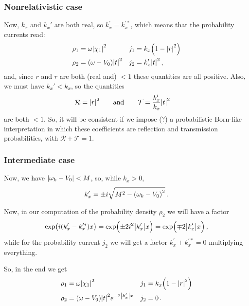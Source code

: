\documentclass[main.tex]{subfiles}
\begin{document}
\subsubsection{Nonrelativistic case}

Now, \(k_x\) and \(k_x'\) are both real, so \(k_x^{\prime } = k_x^{\prime *}\), which means that the probability currents read: 
%
\begin{align}
\rho_1 &= \omega \abs{\chi_1 }^2
&
j_1 &= k_x \qty(1 - \abs{r}^2) \\
\rho_2 &= (\omega - V_0 ) \abs{t}^2 
&
j_2 &=  k_x^{\prime } \abs{t}^2 
\,,
\end{align}
%
and, since \(r\) and \(r\) are both (real and) \(<1\) these quantities are all positive. Also, we must have \(k_x' < k_x\), so the quantities 
%
\begin{align}
\mathcal{R} &= \abs{r}^2
\qquad \text{and} \qquad
\mathcal{T} = \frac{k_x'}{k_x} \abs{t}^2
\,
\end{align}
%
are both \(<1\). So, it will be consistent if we impose (?) a probabilistic Born-like interpretation in which these coefficients are reflection and transmission probabilities, with \(\mathcal{R} + \mathcal{T} = 1\).

\subsubsection{Intermediate case}

Now, we have \(\abs{\omega_{k} - V_0 } < M\), so, while \(k_x>0\), 
%
\begin{align}
k_x' = \pm i \sqrt{M^2 - \qty(\omega_{k} - V_0 )^2}
\,.
\end{align}


Now, in our computation of the probability density \(\rho_2 \) we will have a factor 
%
\begin{align}
\exp(i (k_x' - k_x^{\prime *})x) = \exp(\pm 2 i^2 \abs{k_x'}x) =  \exp(\mp 2 \abs{k_x^{\prime }} x)
\,,
\end{align}
%
while for the probability current \(j_2 \) we will get a factor \(k_x^{\prime } + k_x^{\prime *} = 0 \) multiplying everything.


So, in the end we get 
%
\begin{align}
\rho_1 &= \omega \abs{\chi_1 }^2
&
j_1 &= k_x \qty(1 - \abs{r}^2) \\
\rho_2 &= (\omega - V_0 ) \abs{t}^2 e^{-2 \abs{k_x^{\prime }} x}
&
j_2 &= 0 
\,.
\end{align}
\end{document}

